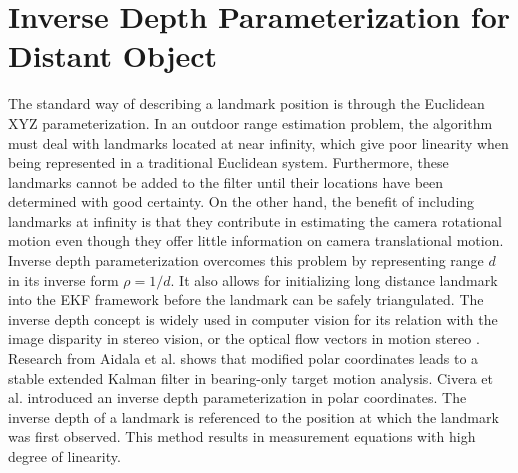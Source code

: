\section{Inverse Depth Parameterization for Distant Object}
The standard way of describing a landmark position is through the
Euclidean XYZ parameterization. In an outdoor range estimation
problem, the algorithm must deal with landmarks located at near
infinity, which give poor linearity when being represented in a
traditional Euclidean system. Furthermore, these landmarks cannot be
added to the filter until their locations have been determined with
good certainty. On the other hand, the benefit of including landmarks
at infinity is that they contribute in estimating the camera
rotational motion even though they offer little information on camera
translational motion. Inverse depth parameterization overcomes this
problem by representing range $d$ in its inverse form $\rho =1/d$. It
also allows for initializing long distance landmark into the EKF
framework before the landmark can be safely triangulated. The inverse
depth concept is widely used in computer vision for its relation with
the image disparity in stereo vision, or the optical flow vectors in
motion stereo \cite{okutomi_multiple-baseline_1991}
\cite{jepson_fast_1991} \cite{chowdhury_stochastic_2003}. Research
from Aidala et al. \cite{aidala_utilization_1983} shows that modified
polar coordinates leads to a stable extended Kalman filter in
bearing-only target motion analysis. Civera et al.
\cite{civera_inverse_2008} introduced an inverse depth
parameterization in polar coordinates. The inverse depth of a landmark
is referenced to the position at which the landmark was first
observed. This method results in measurement equations with high
degree of linearity.





